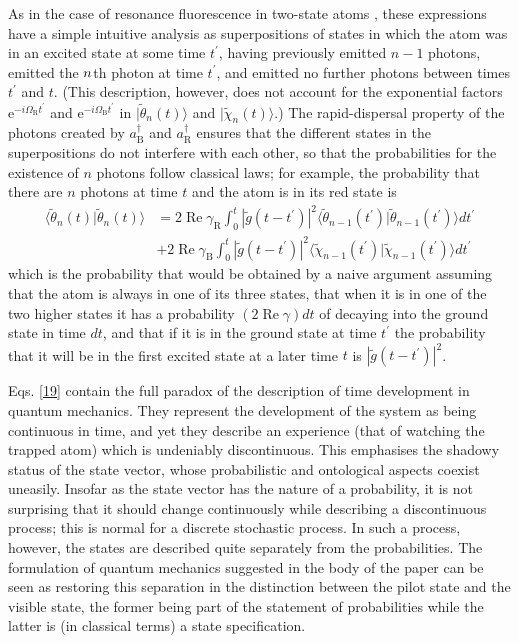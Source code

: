 \documentclass[12pt,a4paper,reqno]{article}
\renewcommand{\(}{\left(}
\renewcommand{\)}{\right)}
\newcommand{\pr}{^\prime}
\newcommand{\e}{\mbox{e}}
\newcommand{\tR}{\text{R}}
\newcommand{\tB}{\text{B}}
\newcommand{\<}{\langle}
\renewcommand{\>}{\rangle}
\renewcommand{\Re}{\operatorname{Re}}
\theoremstyle{plain} %
\theoremstyle{definition}
\theoremstyle{remark}
\begin{document}
As in the case of resonance fluorescence in two-state atoms
\cite{rapid-dispersal}, these expressions have a simple intuitive
analysis as superpositions of states in which the atom was in an excited
state at some time $t\pr$, having previously emitted $n-1$ photons,
emitted the $n\/$th photon at time $t\pr$, and emitted no further
photons between times $t\pr$ and $t$. (This description, however, does
not account for the exponential factors $\e^{-i\Omega_{\tR}t\pr}$ and
$\e^{-i\Omega_{\tB}t\pr}$ in $|\tilde{\theta}_n(t)\>$ and
$|\tilde{\chi}_n(t)\>$.) The rapid-dispersal property of the photons
created by $a_{\tB}^\dagger$ and $a_{\tR}^\dagger$ ensures that the
different states in the superpositions do not interfere with each other,
so that the probabilities for the existence of $n$ photons follow
classical laws; for example, the probability that there are $n$ photons
at time $t$ and the atom is in its red state is
\begin{equation}
\begin{aligned}
\<\tilde{\theta}_n(t)|\tilde{\theta}_n(t)\>& = 2\Re\gamma_{\tR}
\int_0^t|\tilde{g}(t-t\pr)|^2
\<\tilde{\theta}_{n-1}(t\pr)|\tilde{\theta}_{n-1}(t\pr)\>dt\pr\\
&+2\Re\gamma_{\tB}\int_0^t|\tilde{g}(t-t\pr)|^2
\<\tilde{\chi}_{n-1}(t\pr)|\tilde{\chi}_{n-1}(t\pr)\>dt\pr 
\end{aligned}
\end{equation}
which is the probability that would be obtained by a naive argument
assuming that the atom is always in one of its three states, that when
it is in one of the two higher states it has a probability
$(2\Re\gamma)dt$ of decaying into the ground state in time $dt$, and that
if it is in the ground state at time $t\pr$ the probability that it will
be in the first excited state at a later time $t$ is
$|\tilde{g}(t-t\pr)|^2$. 

Eqs. \eqref{19} contain the full paradox of the description of
time development in quantum mechanics. They represent the development of
the system as being continuous in time, and yet they describe an
experience (that of watching the trapped atom) which is undeniably
discontinuous. This emphasises the shadowy status of the state vector,
whose probabilistic and ontological aspects coexist uneasily. Insofar as
the state vector has the nature of a probability, it is not surprising
that it should change continuously while describing a discontinuous
process; this is normal for a discrete stochastic process. In such a
process, however, the states are described quite separately from the
probabilities. The formulation of quantum mechanics suggested in the
body of the paper can be seen as restoring this separation in the 
distinction between the pilot state and the visible state, the former
being part of the statement of probabilities while the latter
is (in classical terms) a state specification. 
\end{document}

